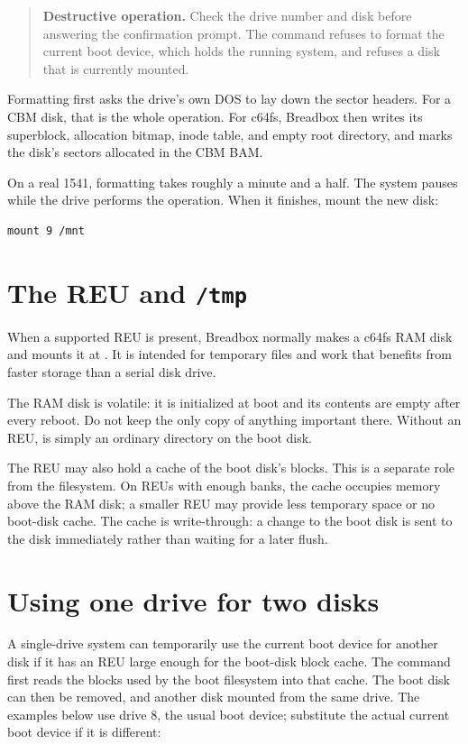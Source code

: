 \begin{quote}
\textbf{Destructive operation.} Check the drive number and disk before answering the confirmation prompt. The command refuses to format the current boot device, which holds the running system, and refuses a disk that is currently mounted.
\end{quote}

Formatting first asks the drive's own DOS to lay down the sector headers. For a CBM disk, that is the whole operation. For c64fs, Breadbox then writes its superblock, allocation bitmap, inode table, and empty root directory, and marks the disk's sectors allocated in the CBM BAM.

On a real 1541, formatting takes roughly a minute and a half. The system pauses while the drive performs the operation. When it finishes, mount the new disk:

\begin{lstlisting}
mount 9 /mnt
\end{lstlisting}

\section{The REU and \texttt{/tmp}}

When a supported REU is present, Breadbox normally makes a c64fs RAM disk and mounts it at . It is intended for temporary files and work that benefits from faster storage than a serial disk drive.

The RAM disk is volatile: it is initialized at boot and its contents are empty after every reboot. Do not keep the only copy of anything important there. Without an REU,  is simply an ordinary directory on the boot disk.

The REU may also hold a cache of the boot disk's blocks. This is a separate role from the  filesystem. On REUs with enough banks, the cache occupies memory above the RAM disk; a smaller REU may provide less temporary space or no boot-disk cache. The cache is write-through: a change to the boot disk is sent to the disk immediately rather than waiting for a later flush.

\section{Using one drive for two disks}

A single-drive system can temporarily use the current boot device for another disk if it has an REU large enough for the boot-disk block cache. The  command first reads the blocks used by the boot filesystem into that cache. The boot disk can then be removed, and another disk mounted from the same drive. The examples below use drive 8, the usual boot device; substitute the actual current boot device if it is different:

